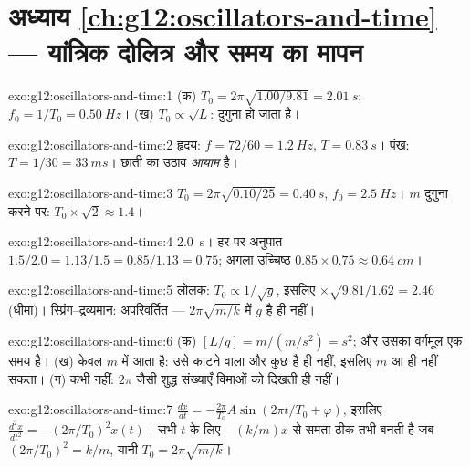 \section*{अध्याय \ref{ch:g12:oscillators-and-time} --- यांत्रिक दोलित्र और समय का मापन}

\begin{solution}{exo:g12:oscillators-and-time:1}
(क) $T_0 = 2\pi\sqrt{1.00/9.81} = \qty{2.01}{s}$; $f_0 = 1/T_0 = \qty{0.50}{Hz}$। (ख) $T_0 \propto \sqrt{L}$:  दुगुना हो जाता है।
\end{solution}

\begin{solution}{exo:g12:oscillators-and-time:2}
हृदय: $f = 72/60 = \qty{1.2}{Hz}$, $T = \qty{0.83}{s}$। पंख: $T = 1/30 = \qty{33}{ms}$। छाती का उठाव \emph{आयाम} है।
\end{solution}

\begin{solution}{exo:g12:oscillators-and-time:3}
$T_0 = 2\pi\sqrt{0.10/25} = \qty{0.40}{s}$, $f_0 = \qty{2.5}{Hz}$। $m$ दुगुना करने पर: $T_0 \times \sqrt{2} \approx 1.4$।
\end{solution}

\begin{solution}{exo:g12:oscillators-and-time:4}
 \qty{2.0}{s}। हर  पर अनुपात $1.5/2.0 = 1.13/1.5 = 0.85/1.13
= 0.75$; अगला
उच्चिष्ठ $0.85 \times 0.75 \approx
\qty{0.64}{cm}$।
\end{solution}

\begin{solution}{exo:g12:oscillators-and-time:5}
लोलक: $T_0 \propto 1/\sqrt{g}$, इसलिए $\times\sqrt{9.81/1.62} =
2.46$ (धीमा)। स्प्रिंग--द्रव्यमान: अपरिवर्तित --- $2\pi\sqrt{m/k}$
में $g$ है ही नहीं।
\end{solution}

\begin{solution}{exo:g12:oscillators-and-time:6}
(क) $[L/g] = \unit{m}/(\unit{m/s^2}) = \unit{s^2}$; और उसका वर्गमूल एक समय है। (ख)  केवल $m$ में
आता है: उसे काटने वाला और कुछ है ही नहीं, इसलिए $m$ आ ही नहीं सकता।
(ग) कभी नहीं: $2\pi$ जैसी शुद्ध संख्याएँ विमाओं को दिखती ही नहीं।
\end{solution}

\begin{solution}{exo:g12:oscillators-and-time:7}
$\frac{dx}{dt} = -\frac{2\pi}{T_0}A\sin(2\pi t/T_0 + \varphi)$, इसलिए $\frac{d^2x}{dt^2} = -(2\pi/T_0)^2 x(t)$। सभी $t$ के लिए $-(k/m)x$ से समता ठीक तभी बनती है जब
$(2\pi/T_0)^2 = k/m$, यानी $T_0 = 2\pi\sqrt{m/k}$।
\end{solution}

